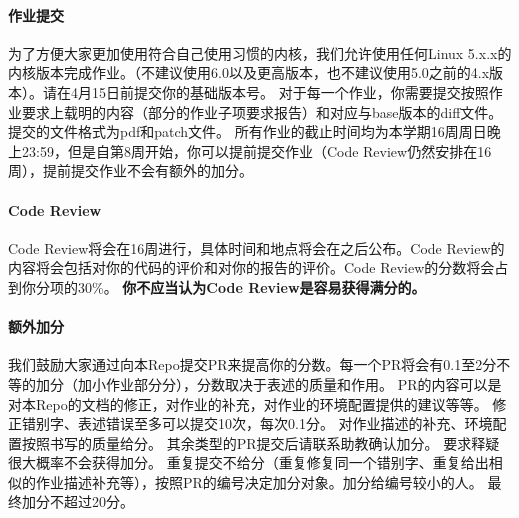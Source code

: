 \paragraph*{作业提交}
为了方便大家更加使用符合自己使用习惯的内核，我们允许使用任何Linux 5.x.x的内核版本完成作业。（不建议使用6.0以及更高版本，也不建议使用5.0之前的4.x版本）。请在4月15日前提交你的基础版本号。
对于每一个作业，你需要提交按照作业要求上载明的内容（部分的作业子项要求报告）和对应与base版本的diff文件。提交的文件格式为pdf和patch文件。
所有作业的截止时间均为本学期16周周日晚上23:59，但是自第8周开始，你可以提前提交作业（Code Review仍然安排在16周），提前提交作业不会有额外的加分。

\paragraph*{Code Review}
Code Review将会在16周进行，具体时间和地点将会在之后公布。Code Review的内容将会包括对你的代码的评价和对你的报告的评价。Code Review的分数将会占到你分项的30\%。
\textbf{你不应当认为Code Review是容易获得满分的。}

\paragraph*{额外加分}
我们鼓励大家通过向本Repo提交PR来提高你的分数。每一个PR将会有0.1至2分不等的加分（加小作业部分分），分数取决于表述的质量和作用。
PR的内容可以是对本Repo的文档的修正，对作业的补充，对作业的环境配置提供的建议等等。
修正错别字、表述错误至多可以提交10次，每次0.1分。
对作业描述的补充、环境配置按照书写的质量给分。
其余类型的PR提交后请联系助教确认加分。
要求释疑很大概率不会获得加分。
重复提交不给分（重复修复同一个错别字、重复给出相似的作业描述补充等），按照PR的编号决定加分对象。加分给编号较小的人。
最终加分不超过20分。
